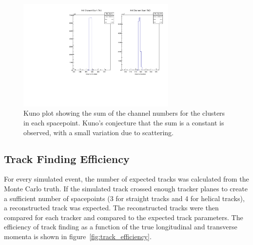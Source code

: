     \begin{figure}[t]
     \centering
     \includegraphics[width=0.7\textwidth, angle=0]{08-Performance/Kuno6mm.pdf}
     \caption{\label{fig:kuno} Kuno plot showing the sum of the channel numbers for the clusters in each spacepoint. Kuno's conjecture that the sum is a constant is observed, with a small variation due to scattering.}
    \end{figure}

  \subsection{Track Finding Efficiency}
  \label{sec:performance:track_finding}

  For every simulated event, the number of expected tracks was calculated from the Monte Carlo truth. If the simulated track crossed enough tracker planes to create a sufficient number of spacepoints (3 for straight tracks and 4 for helical tracks), a reconstructed track was expected. The reconstructed tracks were then compared for each tracker and compared to the expected track parameters. The efficiency of track finding as a function of the true longitudinal and transverse momenta is shown in figure~\ref{fig:track_efficiency}.

